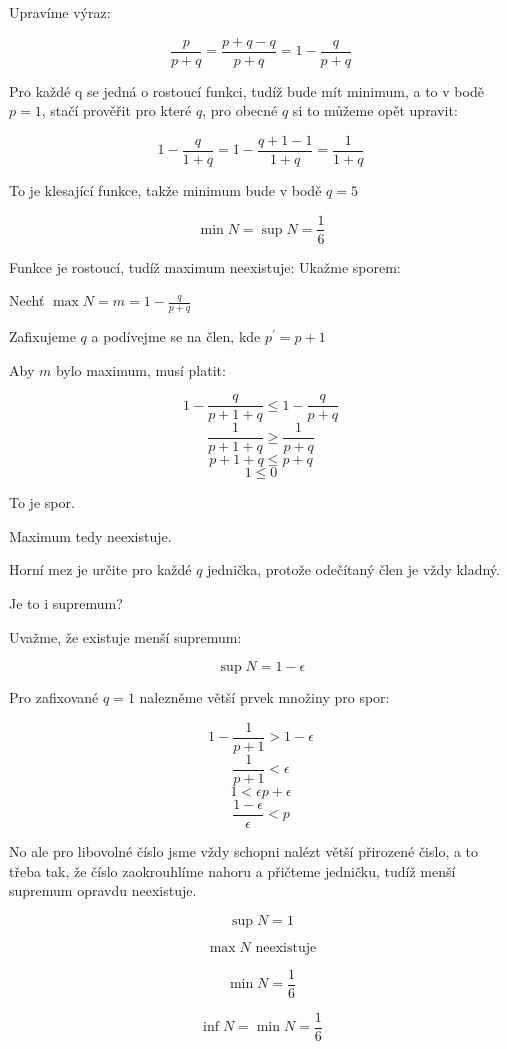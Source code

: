 \documentclass[10pt,a4paper]{article}
\theoremstyle{plain}
\theoremstyle{definition}
\begin{document}
Upravíme výraz:

\[ \frac{p}{p+q} = \frac{p+q -q}{p+q}= 1 - \frac{q}{p+q} \]

Pro každé q se jedná o rostoucí funkci, tudíž bude mít minimum, a to v bodě $p = 1$, stačí prověřit pro které $q$, pro obecné $q$ si to můžeme opět upravit:

\[1-\frac{q}{1+q}=1-\frac{q+1-1}{1+q}=\frac{1}{1+q}\]

To je klesající funkce, takže minimum bude v bodě $q = 5$

\[ \min N = \sup N = \frac16 \]

Funkce je rostoucí, tudíž maximum neexistuje: Ukažme sporem:

Nechť $\max N = m = 1 - \frac{q}{p+q}$

Zafixujeme $q$ a podívejme se na člen, kde $p^\prime = p+1$

Aby $m$ bylo maximum, musí platit:

\[ 1 - \frac{q}{p+1+q} \leq 1 - \frac{q}{p+q} \]
\[ \frac{1}{p+1+q} \geq  \frac{1}{p+q} \]
\[ {p+1+q} \leq  {p+q} \]
\[ 1 \leq  0 \]

To je spor.

Maximum tedy neexistuje. 

Horní mez je určite pro každé $q$ jednička, protože odečítaný člen je vždy kladný.

Je to i supremum?

Uvažme, že existuje menší supremum:

\[\sup N = 1 - \epsilon\]

Pro zafixované $q = 1$ nalezněme větší prvek množiny pro spor:

\[ 1 - \frac{1}{p+1} > 1 - \epsilon\]
\[  \frac{1}{p+1} <  \epsilon\]
\[  1 <  \epsilon p+ \epsilon \]
\[  \frac{1 - \epsilon}{\epsilon} < p \]

No ale pro libovolné číslo jsme vždy schopni nalézt větší přirozené čislo, a to třeba tak, že číslo zaokrouhlíme nahoru a přičteme jedničku, tudíž menší supremum opravdu neexistuje.

\[ \sup N = 1 \] 

\[ \max N \text{ neexistuje} \]

\[\min N = \frac16 \]  

\[\inf N = \min N = \frac16 \]
\end{document}
